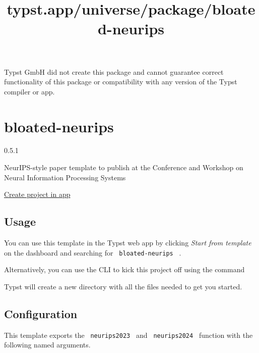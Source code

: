 Typst GmbH did not create this package and cannot guarantee correct
functionality of this package or compatibility with any version of the
Typst compiler or app.


\title{typst.app/universe/package/bloated-neurips}

\label{banner}
\label{template-thumbnail}

\section{bloated-neurips}\label{bloated-neurips}

{ 0.5.1 }

NeurIPS-style paper template to publish at the Conference and Workshop
on Neural Information Processing Systems

\href{/app?template=bloated-neurips&version=0.5.1}{Create project in
app}

\label{readme}
\subsection{Usage}\label{usage}

You can use this template in the Typst web app by clicking \emph{Start
from template} on the dashboard and searching for
\texttt{\ bloated-neurips\ } .

Alternatively, you can use the CLI to kick this project off using the
command

\begin{Shaded}
\begin{Highlighting}[]
\end{Highlighting}
\end{Shaded}

Typst will create a new directory with all the files needed to get you
started.

\subsection{Configuration}\label{configuration}

This template exports the \texttt{\ neurips2023\ } and
\texttt{\ neurips2024\ } function with the following named arguments.

